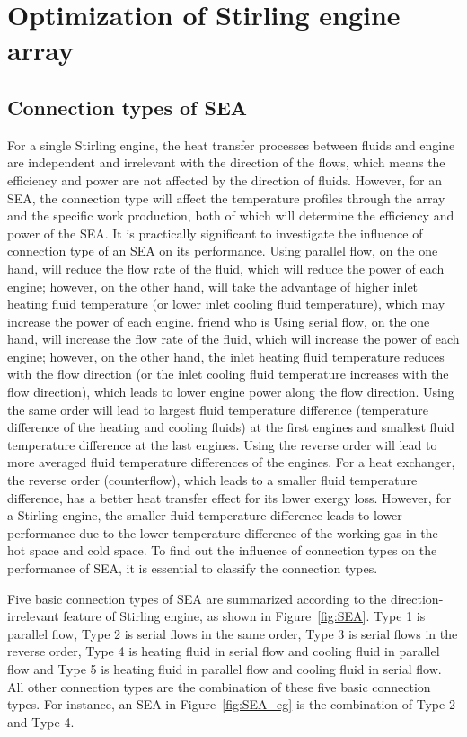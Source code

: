 \chapter{Optimization of Stirling engine array}

\section{Connection types of SEA}
\label{sec:connectionTypes}
For a single Stirling engine, the heat transfer processes between fluids and engine are independent and irrelevant with the direction of the flows, which means the efficiency and power are not affected by the direction of fluids. However, for an SEA, the connection type will affect the temperature profiles through the array and the specific work production, both of which will determine the efficiency and power of the SEA. It is practically significant to investigate the influence of connection type of an SEA on its performance. Using parallel flow, on the one hand, will reduce the flow rate of the fluid, which will reduce the power of each engine; however, on the other hand, will take the advantage of higher inlet heating fluid temperature (or lower inlet cooling fluid temperature), which may increase the power of each engine. friend who is Using serial flow, on the one hand, will increase the flow rate of the fluid, which will increase the power of each engine; however, on the other hand, the inlet heating fluid temperature reduces with the flow direction (or the inlet cooling fluid temperature increases with the flow direction), which leads to lower engine power along the flow direction. Using the same order will lead to largest fluid temperature difference (temperature difference of the heating and cooling fluids) at the first engines and smallest fluid temperature difference at the last engines. Using the reverse order will lead to more averaged fluid temperature differences of the engines. For a heat exchanger, the reverse order (counterflow), which leads to a smaller fluid temperature difference, has a better heat transfer effect for its lower exergy loss. However, for a Stirling engine, the smaller fluid temperature difference leads to lower performance due to the lower temperature difference of the working gas in the hot space and cold space. To find out the influence of connection types on the performance of SEA, it is essential to classify the connection types.

Five basic connection types of SEA are summarized according to the direction-irrelevant feature of Stirling engine, as shown in Figure~\ref{fig:SEA}. Type 1 is parallel flow, Type 2 is serial flows in the same order, Type 3 is serial flows in the reverse order, Type 4 is heating fluid in serial flow and cooling fluid in parallel flow and Type 5 is heating fluid in parallel flow and cooling fluid in serial flow. All other connection types are the combination of these five basic connection types. For instance, an SEA in Figure~\ref{fig:SEA_eg} is the combination of Type 2 and Type 4. 

